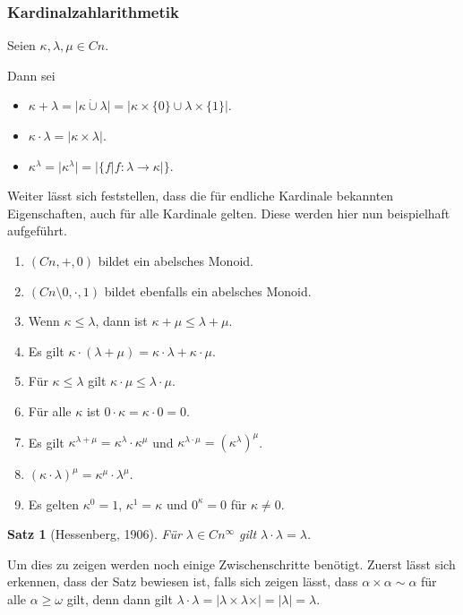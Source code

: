 \documentclass[german]{article}
\theoremstyle{break}
\theoremstyle{def_style}
\theoremstyle{def_style}
\newtheorem{satz}{Satz}[section]
\theoremstyle{lemma_style}
\begin{document}
\subsubsection{Kardinalzahlarithmetik}
Seien $\kappa,\lambda,\mu\in Cn$.

Dann sei
\begin{itemize}
	\item $\kappa+\lambda=\vert \kappa\dot{\cup} \lambda\vert=\vert \kappa\times\{0\} \cup \lambda\times \{1\}\vert$.
	\item $\kappa\cdot\lambda=\vert\kappa\times \lambda\vert$.
	\item $\kappa^\lambda = \vert \kappa^\lambda\vert=\vert\{f \vert f:\lambda\to\kappa\vert\}$.
\end{itemize}

Weiter lässt sich feststellen, dass die für endliche Kardinale bekannten Eigenschaften, auch für alle Kardinale gelten. Diese werden hier nun beispielhaft aufgeführt.

\begin{enumerate}
	\item $(Cn,+,0)$ bildet ein abelsches Monoid.
	\item $(Cn\setminus{0},\cdot, 1)$ bildet ebenfalls ein abelsches Monoid.
	\item Wenn $\kappa\leq\lambda$, dann ist $\kappa+\mu \leq \lambda+\mu$.
	\item Es gilt $\kappa\cdot(\lambda+\mu)=\kappa\cdot\lambda + \kappa\cdot\mu$.
	\item Für $\kappa\leq\lambda$ gilt $\kappa\cdot\mu \leq \lambda\cdot \mu$.
	\item Für alle $\kappa$ ist $0\cdot\kappa=\kappa\cdot 0=0$.
	\item Es gilt $\kappa^{\lambda+\mu}=\kappa^\lambda\cdot\kappa^\mu$ und $\kappa^{\lambda\cdot\mu}=(\kappa^\lambda)^\mu$.
	\item $(\kappa\cdot\lambda)^\mu=\kappa^\mu\cdot\lambda^\mu$.
	\item Es gelten $\kappa^0=1$, $\kappa^1=\kappa$ und $0^\kappa=0$ für $\kappa\neq0$.
\end{enumerate}

\begin{satz}[Hessenberg, 1906]
	Für $\lambda\in Cn^\infty$ gilt $\lambda\cdot\lambda=\lambda$.
\end{satz}
Um dies zu zeigen werden noch einige Zwischenschritte benötigt. Zuerst lässt sich erkennen, dass der Satz bewiesen ist, falls sich zeigen lässt, dass $\alpha\times\alpha\sim \alpha$ für alle $\alpha\geq\omega$ gilt, denn dann gilt $\lambda\cdot\lambda=\vert\lambda\times\lambda\times\vert=\vert\lambda\vert=\lambda$.
\end{document}
